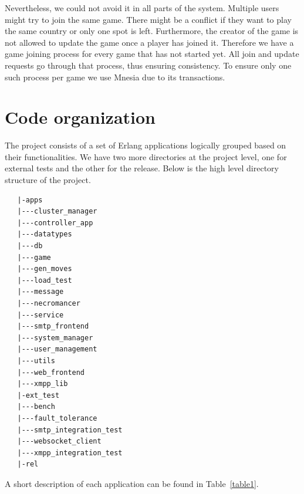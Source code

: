 \documentclass[11pt,a4paper]{report}
\begin{document}
Nevertheless, we could not avoid it in all parts of the system.
Multiple users might try to join the same game.
There might be a conflict if they want to play the same country or only one
spot is left.
Furthermore, the creator of the game is not allowed to update the game once a
player has joined it.
Therefore we have a game joining process for every game that has not started
yet.
All join and update requests go through that process, thus ensuring consistency.
To ensure only one such process per game we use Mnesia due to its transactions.

\section{Code organization}

The project consists of a set of Erlang applications logically grouped
based on their functionalities. We have two more directories at the
project level, one for external tests and the other for the release.
Below is the high level directory structure of the project.

\begin{verbatim}
   |-apps
   |---cluster_manager
   |---controller_app
   |---datatypes
   |---db
   |---game
   |---gen_moves
   |---load_test
   |---message
   |---necromancer
   |---service
   |---smtp_frontend
   |---system_manager
   |---user_management
   |---utils
   |---web_frontend
   |---xmpp_lib
   |-ext_test
   |---bench
   |---fault_tolerance
   |---smtp_integration_test
   |---websocket_client
   |---xmpp_integration_test
   |-rel
\end{verbatim}

A short description of each application can be found in Table~\ref{table1}.
\end{document}
